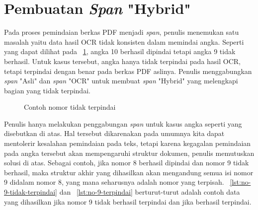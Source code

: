 \section{Pembuatan \textit{Span} "Hybrid"}
\label{penggabungan-data-berkas-pdf-asli-dan-hasil-ocr-ulang}

Pada proses pemindaian berkas PDF menjadi \textit{span}, penulis menemukan satu masalah yaitu data
hasil OCR tidak konsisten dalam memindai angka. Seperti yang dapat dilihat pada
\pic~\ref{fig:contoh-nomor-tidak-terpindai}, angka 10 berhasil dipindai tetapi angka 9 tidak
berhasil. Untuk kasus tersebut, angka hanya tidak terpindai pada hasil OCR, tetapi terpindai dengan
benar pada berkas PDF aslinya. Penulis menggabungkan \textit{span} "Asli" dan \textit{span} "OCR"
untuk membuat \textit{span} "Hybrid" yang melengkapi bagian yang tidak terpindai.

\begin{figure}[H]
  \centering
  \caption{Contoh nomor tidak terpindai}
  \label{fig:contoh-nomor-tidak-terpindai}
\end{figure}

Penulis hanya melakukan penggabungan \textit{span} untuk kasus angka seperti yang disebutkan di
atas. Hal tersebut dikarenakan pada umumnya kita dapat mentolerir kesalahan pemindaian pada teks,
tetapi karena kegagalan pemindaian pada angka tersebut akan mempengaruhi struktur dokumen, penulis
memutuskan solusi di atas. Sebagai contoh, jika nomor 8 berhasil dipindai dan nomor 9 tidak
berhasil, maka struktur akhir yang dihasilkan akan mengandung semua isi nomor 9 didalam nomor 8,
yang mana seharusnya adalah nomor yang terpisah. \lst~\ref{lst:no-9-tidak-terpindai} dan
\lst~\ref{lst:no-9-terpindai} berturut-turut adalah contoh data yang dihasilkan jika nomor 9 tidak
berhasil terpindai dan jika berhasil terpindai.

